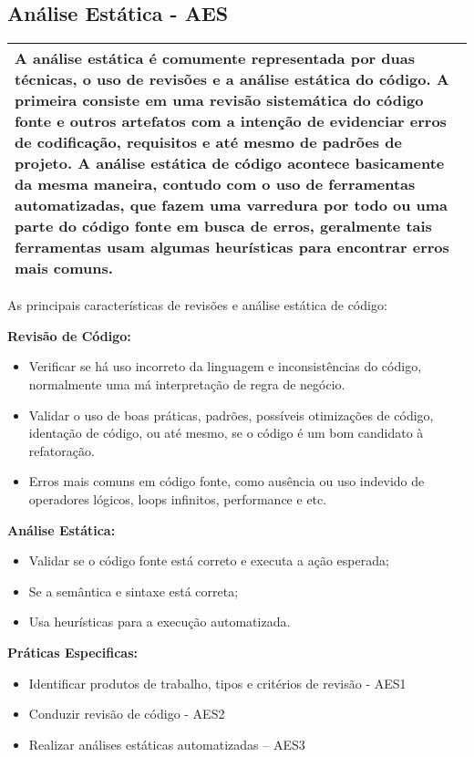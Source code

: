 \subsection{Análise Estática - AES}
\label{sec:aes}

\begin{table}[H]
\centering
\begin{tabular}{|p{130mm}|}
\hline
A análise estática é comumente representada por duas técnicas, o uso de revisões e a análise estática do código. A primeira consiste em uma revisão sistemática do código fonte e outros artefatos com a intenção de evidenciar erros de codificação, requisitos e até mesmo de padrões de projeto. A análise estática de código acontece basicamente da mesma maneira, contudo com o uso de ferramentas automatizadas, que fazem uma varredura por todo ou uma parte do código fonte em busca de erros, geralmente tais ferramentas usam algumas heurísticas para encontrar erros mais comuns. \\ 
\hline
\end{tabular}
\end{table}

As principais características de revisões e análise estática de código:

\textbf{Revisão de Código:}
\begin{itemize}
    \item Verificar se há uso incorreto da linguagem e inconsistências do código, normalmente uma má interpretação de regra de negócio.
    \item Validar o uso de boas práticas, padrões, possíveis otimizações de código, identação de código, ou até mesmo, se o código é um bom candidato à refatoração.
    \item Erros mais comuns em código fonte, como ausência ou uso indevido de operadores lógicos, loops infinitos, performance e etc.
\end{itemize}

\textbf{Análise Estática:}
\begin{itemize}
    \item Validar se o código fonte está correto e executa a ação esperada;
    \item Se a semântica e sintaxe está correta;
    \item Usa heurísticas para a execução automatizada.
\end{itemize}

\textbf{Práticas Especificas:}
\begin{itemize}
    \item Identificar produtos de trabalho, tipos e critérios de revisão - AES1
    \item Conduzir revisão de código - AES2
    \item Realizar análises estáticas automatizadas – AES3
\end{itemize}

